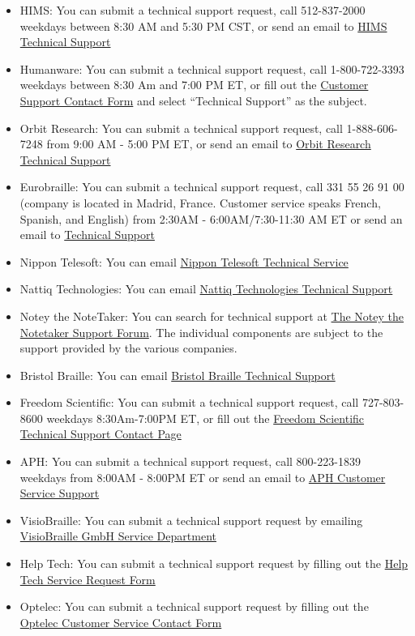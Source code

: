 \begin{itemize}[leftmargin=*]
	\item HIMS: You can submit a technical support request, call 512-837-2000 weekdays between 8:30 AM and 5:30 PM CST, or send an email to \href{mailto:support@hims-inc.com}{HIMS Technical Support}  
	\item Humanware: You can submit a technical support request, call 1-800-722-3393 weekdays between 8:30 Am and 7:00 PM ET, or fill out the \href{http://store.humanware.com/hus/contact/}{Customer Support Contact Form} and select ``Technical Support'' as the subject. 
	\item Orbit Research: You can submit a technical support request, call 1-888-606-7248 from 9:00 AM - 5:00 PM ET, or send an email to \href{mailto:techsupport@orbitresearch.com}{Orbit Research Technical Support}  
	\item Eurobraille: You can submit a technical support request, call 331 55 26 91 00 (company is located in Madrid, France. Customer service speaks French, Spanish, and English) from 2:30AM - 6:00AM/7:30-11:30 AM ET or send an email to \href{mailto:econtact@eurobraille.fr}{Technical Support}  
	\item Nippon Telesoft: You can email \href{mailto:ts-email@telesoft.co.jp}{Nippon Telesoft Technical Service}  
	\item Nattiq Technologies: You can email \href{mailto:info@nattiq.com}{Nattiq Technologies Technical Support}  
	\item Notey the NoteTaker: You can search for technical support at \href{http://notey-project.com/2023/03/31/notey-forum-tech-support/}{The Notey the Notetaker Support Forum}. The individual components are subject to the support provided by the various companies. 
	\item Bristol Braille: You can email \href{mailto:support@bristolbraille.org}{Bristol Braille Technical Support}  
	\item Freedom Scientific: You can submit a technical support request, call 727-803-8600 weekdays 8:30Am-7:00PM ET, or fill out the \href{http://support.freedomscientific.com/Forms/TechSupport}{Freedom Scientific Technical Support Contact Page}  
	\item APH: You can submit a technical support request, call 800-223-1839 weekdays from 8:00AM - 8:00PM ET or send an email to \href{mailto:cs@aph.org}{APH Customer Service Support}  
	\item VisioBraille: You can submit a technical support request by emailing \href{mailto:service@visiobraille.de}{VisioBraille GmbH Service Department}  
	\item Help Tech: You can submit a technical support request by filling out the \href{http://www.helptech.eu/contact}{Help Tech Service Request Form}  
	\item Optelec: You can submit a technical support request by filling out the \href{http://in.optelec.com/dealers/contactform}{Optelec Customer Service Contact Form}  
\end{itemize}

